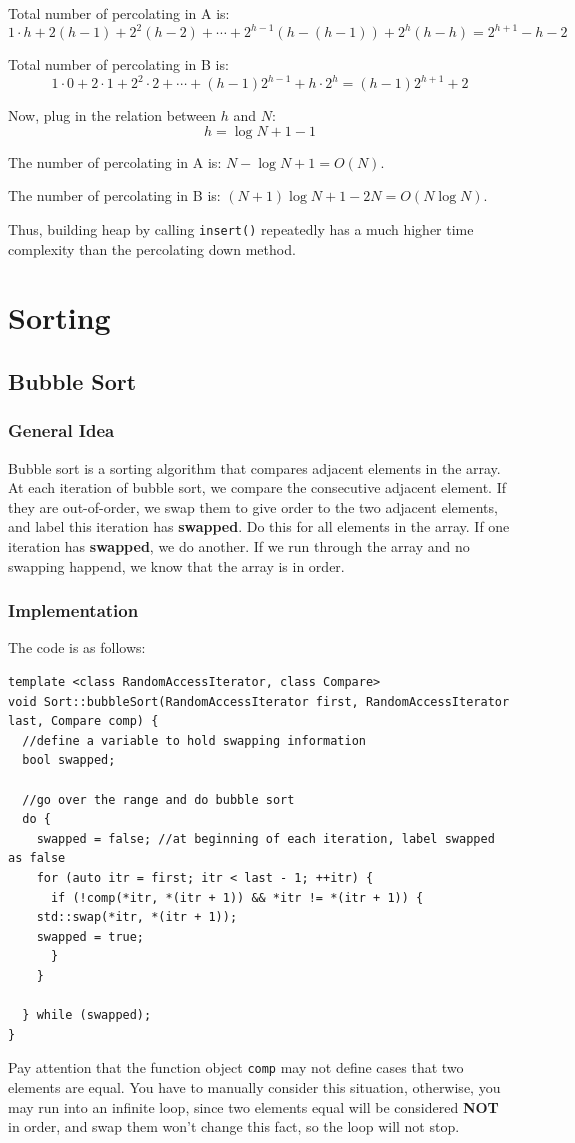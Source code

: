 \documentclass[11pt]{book}
\begin{document}
Total number of percolating in A is:
\[
1 \cdot h + 2(h - 1) + 2^2(h - 2) + \cdots + 2^{h - 1}(h - (h - 1)) + 2^h(h - h)
=2^{h + 1} - h - 2
\]


Total number of percolating in B is:
\[
1 \cdot 0 + 2 \cdot 1 + 2^2 \cdot 2 + \cdots + (h - 1)2^{h - 1} + h \cdot 2^h
= (h - 1)2^{h + 1} + 2
\]

Now, plug in the relation between \(h\) and \(N\):
\[
h = \log{N + 1} - 1
\]

The number of percolating in A is: \(N - \log{N + 1} = O(N)\).

The number of percolating in B is: \((N + 1)\log{N + 1} - 2N = O(N\log{N})\).

Thus, building heap by calling \texttt{insert()} repeatedly has a much higher time complexity than the percolating down method.
\part{Sorting}
\label{sec:org9cf303b}
\chapter{Bubble Sort}
\label{sec:orge21ded5}
\section{General Idea}
\label{sec:org771581b}
Bubble sort is a sorting algorithm that compares adjacent elements in the array. At each iteration of bubble sort, we compare the consecutive adjacent element. If they are out-of-order, we swap them to give order to the two adjacent elements, and label this iteration has \textbf{swapped}. Do this for all elements in the array. If one iteration has \textbf{swapped}, we do another. If we run through the array and no swapping happend, we know that the array is in order.
\section{Implementation}
\label{sec:org932e17f}
The code is as follows:
\begin{verbatim}
template <class RandomAccessIterator, class Compare>
void Sort::bubbleSort(RandomAccessIterator first, RandomAccessIterator last, Compare comp) {
  //define a variable to hold swapping information
  bool swapped;

  //go over the range and do bubble sort
  do {
    swapped = false; //at beginning of each iteration, label swapped as false
    for (auto itr = first; itr < last - 1; ++itr) {
      if (!comp(*itr, *(itr + 1)) && *itr != *(itr + 1)) {
	std::swap(*itr, *(itr + 1));
	swapped = true;
      }
    }

  } while (swapped);
}
\end{verbatim}
Pay attention that the function object \texttt{comp} may not define cases that two elements are equal. You have to manually consider this situation, otherwise, you may run into an infinite loop, since two elements equal will be considered \textbf{NOT} in order, and swap them won't change this fact, so the loop will not stop.
\end{document}
